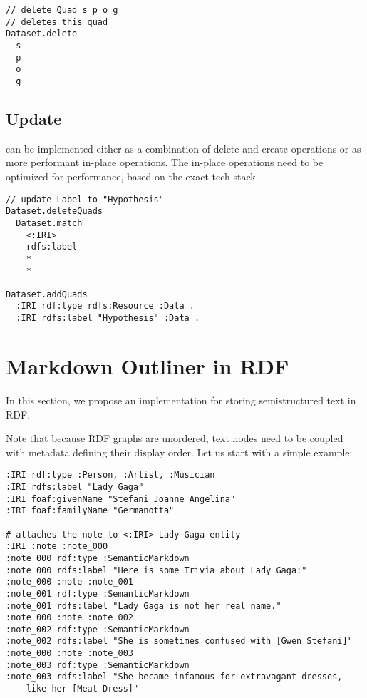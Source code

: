 \begin{lstlisting}
// delete Quad s p o g
// deletes this quad
Dataset.delete
  s
  p
  o
  g

\end{lstlisting}

\subsection*{Update} 
can be implemented either as a combination of delete and create operations or as more performant in-place operations. The in-place operations need to be optimized for performance, based on the exact tech stack.

\begin{lstlisting}
// update Label to "Hypothesis"
Dataset.deleteQuads
  Dataset.match
    <:IRI> 
    rdfs:label 
    * 
    *

Dataset.addQuads
  :IRI rdf:type rdfs:Resource :Data .
  :IRI rdfs:label "Hypothesis" :Data .

\end{lstlisting}






\section{Markdown Outliner in RDF}

In this section, we propose an implementation for storing semistructured text in RDF.

Note that because RDF graphs are unordered, text nodes need to be coupled with metadata defining their display order. Let us start with a simple example:

\begin{verbatim}
:IRI rdf:type :Person, :Artist, :Musician
:IRI rdfs:label "Lady Gaga"
:IRI foaf:givenName "Stefani Joanne Angelina"
:IRI foaf:familyName "Germanotta"

# attaches the note to <:IRI> Lady Gaga entity
:IRI :note :note_000                
:note_000 rdf:type :SemanticMarkdown
:note_000 rdfs:label "Here is some Trivia about Lady Gaga:"
:note_000 :note :note_001
:note_001 rdf:type :SemanticMarkdown
:note_001 rdfs:label "Lady Gaga is not her real name."
:note_000 :note :note_002
:note_002 rdf:type :SemanticMarkdown
:note_002 rdfs:label "She is sometimes confused with [Gwen Stefani]"
:note_000 :note :note_003
:note_003 rdf:type :SemanticMarkdown
:note_003 rdfs:label "She became infamous for extravagant dresses, 
    like her [Meat Dress]"
\end{verbatim}


